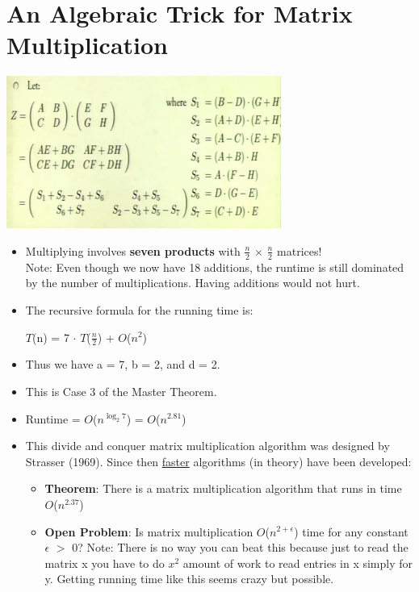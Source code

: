 \documentclass[12pt]{article}
\begin{document}
\section{An Algebraic Trick for Matrix Multiplication}
\renewcommand{\labelitemii}{$\circ$}
\renewcommand{\labelitemiii}{$\cdot$}
\renewcommand{\labelitemiii}{$\rightarrow$}
\includegraphics{lecture47}
\begin{itemize}
\item Multiplying involves \textbf{seven products} with $\frac{n}{2}$ $\times$ $\frac{n}{2}$ matrices!\\
Note: Even though we now have 18 additions, the runtime is still dominated by the number of multiplications. Having additions would not hurt.
\item The recursive formula for the running time is:
	
	\hspace*{\fill} {\large $T$(n) = 7 $\cdot$ $T$($\frac{n}{2}$) + $O$($n^2$) }\hspace*{\fill} 
	
	\item Thus we have a = 7, b = 2, and d = 2.
	\item This is Case 3 of the Master Theorem.
	\item Runtime = $O$($n^{\log_2 7}$) = $O$($n^{2.81}$)
\item This divide and conquer matrix multiplication algorithm was designed by Strasser (1969). Since then \underline{faster} algorithms (in theory) have been developed:
	\begin{itemize}
	\item \textbf{Theorem}: There is a matrix multiplication algorithm that runs in time $O$($n^{2.37}$)
	\item \textbf{Open Problem}: Is matrix multiplication $O$($n^{2 + \epsilon}$) time for any constant $\epsilon$ $>$ 0?
	Note: There is no way you can beat this because just to read the matrix x you have to do $x^2$ amount of work to read entries in x simply for y. Getting running time like this seems crazy but possible.
	\end{itemize}
\end{itemize}
\end{document}
